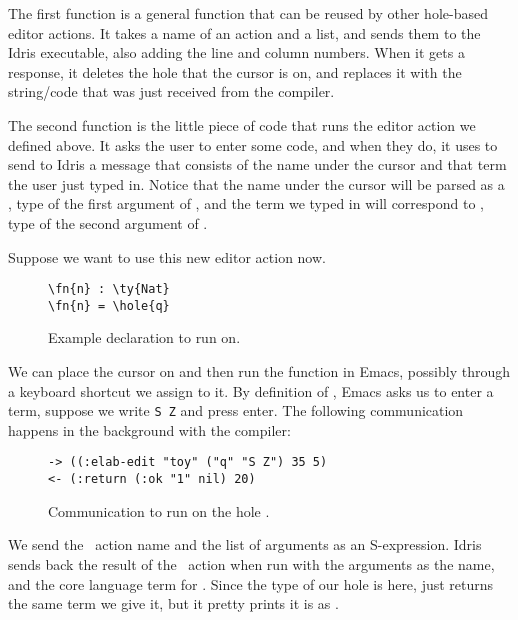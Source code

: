 The first function  is a general function that can be
reused by other hole-based editor actions. It takes a name of an action and a
list, and sends them to the Idris executable, also adding the line and column
numbers. When it gets a response, it deletes the hole that the cursor is on,
and replaces it with the string/code that was just received from the compiler.

The second function  is the little piece of code that runs the
 editor action we defined above. It asks the user to enter some code,
and when they do, it uses  to send to Idris a message
that consists of the name under the cursor and that term the user just typed
in. Notice that the name under the cursor will be parsed as a , type
of the first argument of , and the term we typed in will correspond to
\TT, type of the second argument of .

Suppose we want to use this new editor action now.

\begin{figure}[ht]
\caption{Example  declaration to run  on.}
\begin{Verbatim}[framesep=2mm, label=\footnotesize{\normalfont{Idris}}, labelposition=topline]
\fn{n} : \ty{Nat}
\fn{n} = \hole{q}
\end{Verbatim}
\end{figure}

We can place the cursor on  and then run the  function in
Emacs, possibly through a keyboard shortcut we assign to it.
By definition of , Emacs asks us to enter a term, suppose we
write \texttt{S Z} and press enter.
The following communication happens in the background with the compiler:

\begin{figure}[ht]
  \caption{Communication to run  on the hole .}
\begin{Verbatim}[framesep=2mm, label=\footnotesize{\normalfont{S-expression}}, labelposition=topline]
-> ((:elab-edit "toy" ("q" "S Z") 35 5)
<- (:return (:ok "1" nil) 20)
\end{Verbatim}
\end{figure}

We send the \Elab\ action name  and the list of arguments as an
S-expression. Idris sends back the result of the \Elab\ action when run with
the arguments  as the name, and the core language term for .
Since the type of our hole is  here,  just returns the same
term we give it, but it pretty prints it is as .

